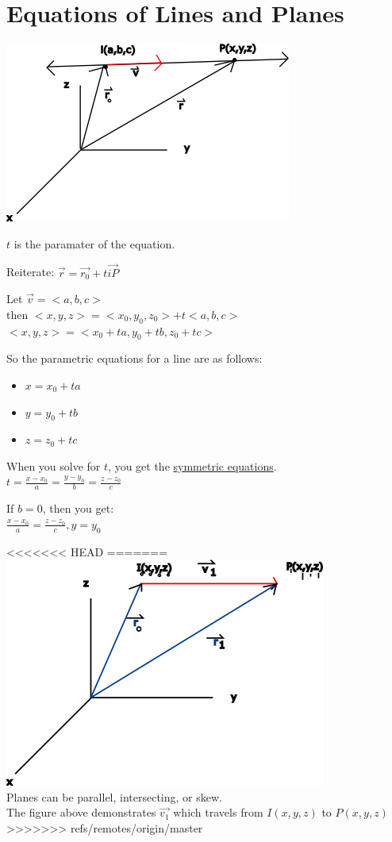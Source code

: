 \documentclass[12pt]{article}
\begin{document}
\section{Equations of Lines and Planes} 

\includegraphics{line3d}

$t$ is the paramater of the equation.

Reiterate: $\vec{r} = \vec{r_0} +t \vec{iP} $

Let $\vec{v}=<a,b,c> $\\%
then $<x,y,z>=<x_0,y_0,z_0> + t<a,b,c>$\\%
$<x,y,z>=<x_0+ta,y_0+tb, z_0+tc>$

So the parametric equations for a line are as follows:
\begin{itemize}
	\item $x=x_0+ta$
	\item $y=y_0+tb$
	\item $z=z_0+tc$
\end{itemize}

When you solve for $t$, you get the \underline{symmetric equations}.\\%
$t=\frac{x-x_0}{a}=\frac{y-y_0}{b}=\frac{z-z_0}{c}$

If $b=0$, then you get:\\%
$\frac{x-x_0}{a}=\frac{z-z_0}{c}, y=y_0$

<<<<<<< HEAD
=======
\includegraphics{3dline2}\\%
Planes can be parallel, intersecting, or skew.\\%
The figure above demonstrates $\vec{v_1}  $ which travels from $I(x,y,z)$ to $P(x,y,z)$
>>>>>>> refs/remotes/origin/master
\end{document}
